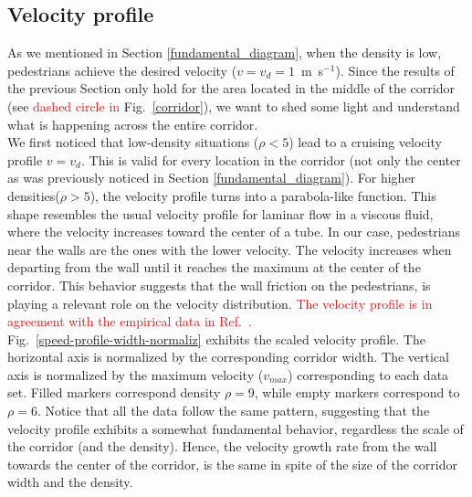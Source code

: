 \documentclass[preprint,12pt]{elsarticle}
\begin{document}
\subsection{\label{velocity_profile} Velocity profile}

As we mentioned in Section \ref{fundamental_diagram}, when the density is low, pedestrians achieve the desired velocity ($v=v_d=1$~m~s$^{-1}$). Since the results of the previous Section only hold for the area located in the middle of the corridor (see \textcolor{red}{dashed circle in} Fig.~\ref{corridor}), we want to shed some light and understand what is happening across the entire corridor.\\

We first noticed that low-density situations ($\rho<5$) lead to a cruising velocity profile $v=v_d$. This is valid for every location in the corridor (not only the center as was previously noticed in Section \ref{fundamental_diagram}). For higher densities($\rho>5$), the velocity profile turns into a parabola-like function. This shape resembles the usual velocity profile for laminar flow in a viscous fluid, where the velocity increases toward the center of a tube. In our case, pedestrians near the walls are the ones with the lower velocity. The velocity increases when departing from the wall until it reaches the maximum at the center of the corridor. This behavior suggests that the wall friction on the pedestrians, is playing a relevant role on the velocity distribution. \textcolor{red}{The velocity profile is in agreement with the empirical data in Ref.~\cite{zhang1}.}  \\

Fig.~\ref{speed-profile-width-normaliz} exhibits the scaled velocity profile. The horizontal axis is normalized by the corresponding corridor width. The vertical axis is normalized by the maximum velocity ($v_{max}$) corresponding to each data set. Filled markers correspond density $\rho=9$, while empty markers correspond to $\rho=6$. Notice that all the data follow the same  pattern, suggesting that the velocity profile exhibits a somewhat fundamental behavior, regardless the scale of the corridor (and the density). Hence, the velocity growth rate from the wall towards the center of the corridor, is the same in spite of the size of the corridor width and the density. \\
\end{document}

